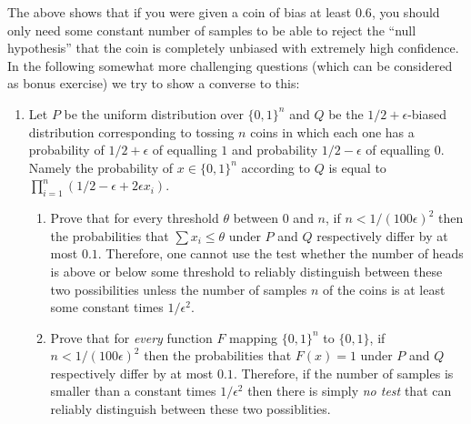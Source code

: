 \begin{enumerate}
  The above shows that if you were given a coin of bias at least
  \(0.6\), you should only need some constant number of samples to be
  able to reject the ``null hypothesis'' that the coin is completely
  unbiased with extremely high confidence. In the following somewhat
  more challenging questions (which can be considered as bonus exercise)
  we try to show a converse to this:

  \begin{enumerate}
  \def\labelenumii{\arabic{enumii}.}
  \item
    Let \(P\) be the uniform distribution over \({\{0,1\}}^n\) and \(Q\)
    be the \(1/2+\epsilon\)-biased distribution corresponding to tossing
    \(n\) coins in which each one has a probability of \(1/2+\epsilon\)
    of equalling \(1\) and probability \(1/2-\epsilon\) of equalling
    \(0\). Namely the probability of \(x\in{\{0,1\}}^n\) according to
    \(Q\) is equal to
    \(\prod_{i=1}^n (1/2 - \epsilon + 2\epsilon x_i)\).

    \begin{enumerate}
    \def\labelenumiii{\arabic{enumiii}.}
    \item
      Prove that for every threshold \(\theta\) between \(0\) and \(n\),
      if \(n < 1/(100\epsilon)^2\) then the probabilities that
      \(\sum x_i \leq \theta\) under \(P\) and \(Q\) respectively differ
      by at most \(0.1\). Therefore, one cannot use the test whether the
      number of heads is above or below some threshold to reliably
      distinguish between these two possibilities unless the number of
      samples \(n\) of the coins is at least some constant times
      \(1/\epsilon^2\).
    \item
      Prove that for \emph{every} function \(F\) mapping \({\{0,1\}}^n\)
      to \({\{0,1\}}\), if \(n < 1/(100\epsilon)^2\) then the
      probabilities that \(F(x)=1\) under \(P\) and \(Q\) respectively
      differ by at most \(0.1\). Therefore, if the number of samples is
      smaller than a constant times \(1/\epsilon^2\) then there is
      simply \emph{no test} that can reliably distinguish between these
      two possiblities.
    \end{enumerate}
  \end{enumerate}
\end{enumerate}
